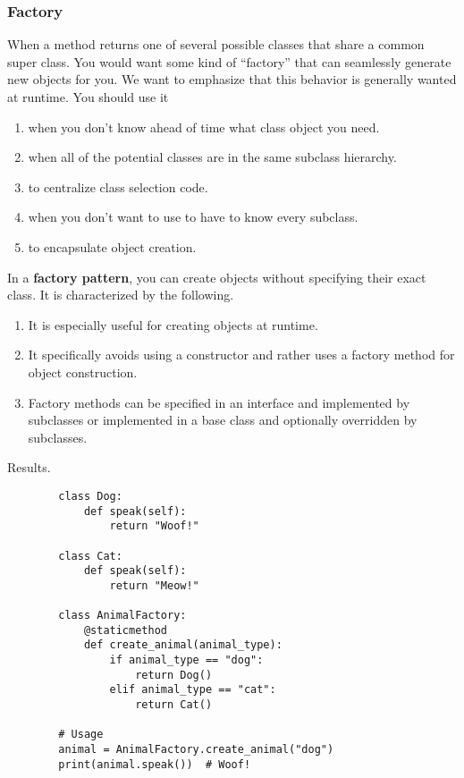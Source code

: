  \subsubsection{Factory} 

    When a method returns one of several possible classes that share a common super class. You would want some kind of ``factory'' that can seamlessly generate new objects for you. We want to emphasize that this behavior is generally wanted at runtime. You should use it 
    \begin{enumerate}
      \item when you don't know ahead of time what class object you need. 
      \item when all of the potential classes are in the same subclass hierarchy. 
      \item to centralize class selection code. 
      \item when you don't want to use to have to know every subclass. 
      \item to encapsulate object creation. 
    \end{enumerate}

    \begin{definition}
      In a \textbf{factory pattern}, you can create objects without specifying their exact class. It is characterized by the following. 
      \begin{enumerate}
        \item It is especially useful for creating objects at runtime. 
        \item It specifically avoids using a constructor and rather uses a factory method for object construction. 
        \item Factory methods can be specified in an interface and implemented by subclasses or implemented in a base class and optionally overridden by subclasses.
      \end{enumerate}
    \end{definition}

    Results. 

    \begin{example}
      \begin{lstlisting}
        class Dog:
            def speak(self):
                return "Woof!"

        class Cat:
            def speak(self):
                return "Meow!"

        class AnimalFactory:
            @staticmethod
            def create_animal(animal_type):
                if animal_type == "dog":
                    return Dog()
                elif animal_type == "cat":
                    return Cat()

        # Usage
        animal = AnimalFactory.create_animal("dog")
        print(animal.speak())  # Woof! 
      \end{lstlisting}
    \end{example}

